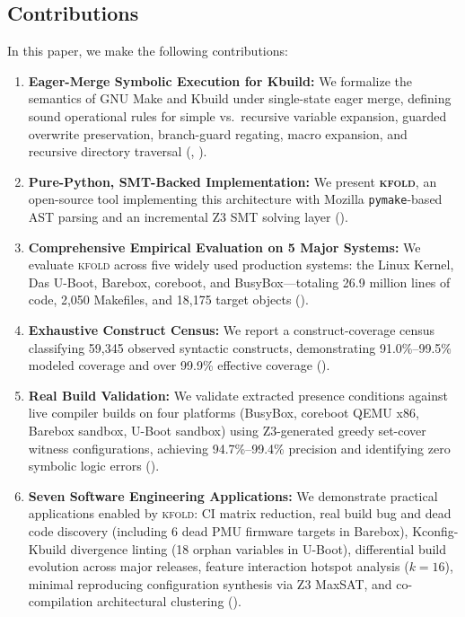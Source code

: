 \documentclass[acmsmall,screen,review]{acmart}
\newcommand{\tool}{\textsc{kfold}\xspace}
\begin{document}
\subsection{Contributions}
\label{sec:intro:contributions}

In this paper, we make the following contributions:

\begin{enumerate}
\item \textbf{Eager-Merge Symbolic Execution for Kbuild:} We formalize the semantics of GNU Make and Kbuild under single-state eager merge, defining sound operational rules for simple vs.\ recursive variable expansion, guarded overwrite preservation, branch-guard regating, macro expansion, and recursive directory traversal (, ).
\item \textbf{Pure-Python, SMT-Backed Implementation:} We present \textbf{\tool}, an open-source tool implementing this architecture with Mozilla \texttt{pymake}-based AST parsing and an incremental Z3 SMT solving layer ().
\item \textbf{Comprehensive Empirical Evaluation on 5 Major Systems:} We evaluate \tool across five widely used production systems: the Linux Kernel, Das U-Boot, Barebox, coreboot, and BusyBox---totaling 26.9 million lines of code, 2,050 Makefiles, and 18,175 target objects ().
\item \textbf{Exhaustive Construct Census:} We report a construct-coverage census classifying 59,345 observed syntactic constructs, demonstrating 91.0\%--99.5\% modeled coverage and over 99.9\% effective coverage ().
\item \textbf{Real Build Validation:} We validate extracted presence conditions against live compiler builds on four platforms (BusyBox, coreboot QEMU x86, Barebox sandbox, U-Boot sandbox) using Z3-generated greedy set-cover witness configurations, achieving 94.7\%--99.4\% precision and identifying zero symbolic logic errors ().
\item \textbf{Seven Software Engineering Applications:} We demonstrate practical applications enabled by \tool: CI matrix reduction, real build bug and dead code discovery (including 6 dead PMU firmware targets in Barebox), Kconfig-Kbuild divergence linting (18 orphan variables in U-Boot), differential build evolution across major releases, feature interaction hotspot analysis ($k=16$), minimal reproducing configuration synthesis via Z3 MaxSAT, and co-compilation architectural clustering ().
\end{enumerate}
\end{document}
